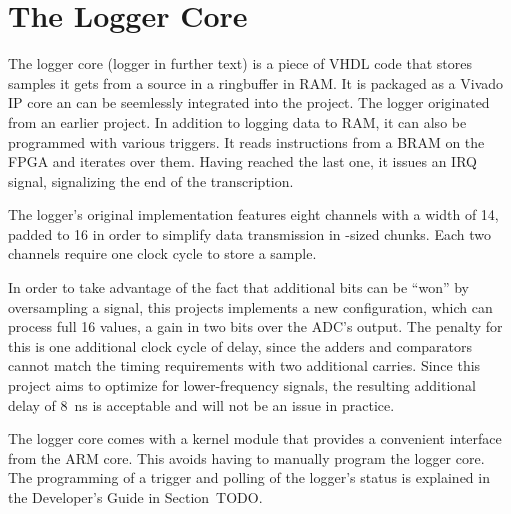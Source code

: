 %
%
\section{The Logger Core} %
\label{sec:fpga:logger}

The logger core (logger  in further text) is a piece of  VHDL code that stores
samples it  gets from a  source in  a ringbuffer in  RAM. It is packaged  as a
Vivado IP core an can be seemlessly integrated into the project.
The logger originated  from an earlier project\cite{huess-schnid}. 
In addition  to logging data  to RAM, it can  also be programmed  with various
triggers. It reads  instructions from  a BRAM  on the  FPGA and  iterates over
them. Having reached  the last one, it  issues an IRQ signal,  signalizing the
end of the transcription.

The logger's original  implementation features eight channels with  a width of
\SI{14}{\bit}, padded to \SI{16}{\bit} in  order to simplify data transmission
in \si{\byte}-sized chunks. Each two channels require one clock cycle to store
a sample.

In order to take advantage of the  fact that additional bits can be ``won'' by
oversampling a signal, this projects implements a new configuration, which can
process full \SI{16}{\bit}  values, a gain in two bits  over the ADC's output.
The penalty for this is one additional  clock cycle of delay, since the adders
and  comparators cannot  match  the timing  requirements  with two  additional
carries.  Since this project aims to optimize for lower-frequency signals, the
resulting additional delay of \SI{8}{\nano\second}  is acceptable and will not
be an issue in practice.

The  logger  core comes  with  a  kernel  module  that provides  a  convenient
interface from the ARM core. This avoids having to manually program the logger
core. The  programming of  a trigger  and polling  of the  logger's status  is
explained in the Developer's Guide in Section~TODO.

%
%
